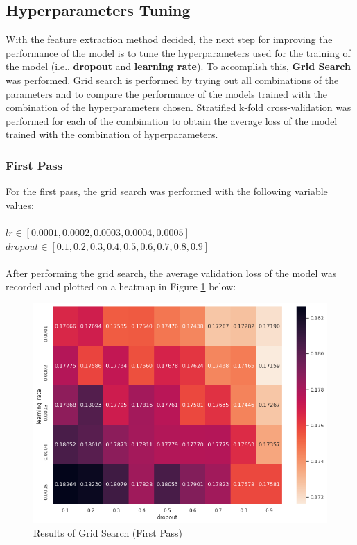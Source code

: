 \documentclass[sigconf,nonacm=true]{acmart}
\begin{document}
\subsection{Hyperparameters Tuning}
With the feature extraction method decided, the next step for improving the performance of the model is to tune the 
hyperparameters used for the training of the model (i.e., \textbf{dropout} and \textbf{learning rate}). To accomplish this,
\textbf{Grid Search} was performed. Grid search is performed by trying out all combinations of the parameters and to compare 
the performance of the models trained with the combination of the hyperparameters chosen. Stratified k-fold cross-validation was 
performed for each of the combination to obtain the average loss of the model trained with the combination of hyperparameters.

\subsubsection{First Pass}
For the first pass, the grid search was performed with the following variable values:\\\\
$lr \in [0.0001, 0.0002, 0.0003, 0.0004,  0.0005]$\\
$dropout \in [0.1, 0.2, 0.3, 0.4,  0.5, 0.6, 0.7, 0.8, 0.9]$\\\\

After performing the grid search, the average validation loss of the model was recorded and plotted 
on a heatmap in Figure \ref{fig:gridsearch1} below:

\begin{figure}[H]
	\centering
	\includegraphics[width=\linewidth]{fig/gridsearch1.png}
	\caption{Results of Grid Search (First Pass)}
	\label{fig:gridsearch1}
\end{figure}
\end{document}
